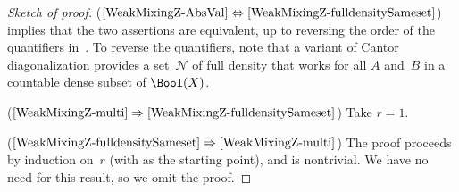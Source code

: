 \begin{proof}[Sketch of proof]
($\ref{WeakMixingZ-AbsVal} \Leftrightarrow \ref{WeakMixingZ-fulldensitySameset}$)
 implies that the two assertions are equivalent, up to reversing the order of the quantifiers in~. To reverse the quantifiers, note that a variant of Cantor diagonalization provides a set~$\mathcal{N}$ of full density that works for all $A$ and~$B$ in a countable dense subset of $\Bool(X)$.

 ($\ref{WeakMixingZ-multi} \Rightarrow \ref{WeakMixingZ-fulldensitySameset}$)
Take $r = 1$.

 ($\ref{WeakMixingZ-fulldensitySameset} \Rightarrow \ref{WeakMixingZ-multi}$)
The proof proceeds by induction on~$r$ (with  as the starting point), and is nontrivial. We have no need for this result, so we omit the proof. %
\end{proof}


